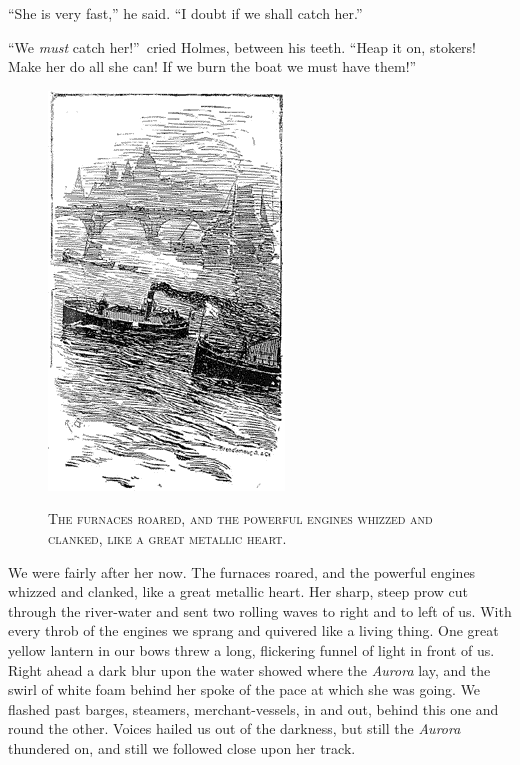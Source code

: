 \documentclass[12pt,english,oneside]{book}
\newcommand{\noun}[1]{\textsc{#1}}
\begin{document}
{}``She is very fast,'' he said. {}``I doubt if we shall catch
her.''

{}``We \textit{must} catch her!''\ cried Holmes, between his teeth.
{}``Heap it on, stokers! Make her do all she can! If we burn the
boat we must have them!''

%
\begin{figure}[htbp]
\noindent \begin{center}\includegraphics{images/sign410-sign-16.png}\end{center}

\noindent \begin{center}\noun{The furnaces roared, and the powerful
engines whizzed and clanked, like a great metallic heart.}\end{center}
\end{figure}
We were fairly after her now. The furnaces roared, and the powerful
engines whizzed and clanked, like a great metallic heart. Her sharp,
steep prow cut through the river-water and sent two rolling waves
to right and to left of us. With every throb of the engines we sprang
and quivered like a living thing. One great yellow lantern in our
bows threw a long, flickering funnel of light in front of us. Right
ahead a dark blur upon the water showed where the \emph{Aurora} lay,
and the swirl of white foam behind her spoke of the pace at which
she was going. We flashed past barges, steamers, merchant-vessels,
in and out, behind this one and round the other. Voices hailed us
out of the darkness, but still the \emph{Aurora} thundered on, and
still we followed close upon her track.
\end{document}
